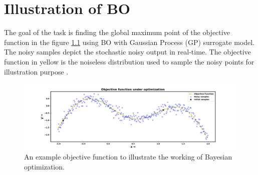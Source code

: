 \chapter{Illustration of BO}
\label{appendix:appendix_bo}
The goal of the task is finding the global maximum point of the objective function in the figure \ref{fig:BO_objective} using BO with Gaussian Process (GP) surrogate model. The noisy samples depict the stochastic noisy output in real-time. The objective function in yellow is the noiseless distribution used to sample the noisy points for illustration purpose \cite{martin_bo_tutorial}. 

\begin{figure}[!ht]
\centering
\includegraphics[width=0.8\linewidth,height=0.25\textheight]{images/BO_objective.png}
\captionsetup{justification=justified}
\caption[An example objective function under BO]{An example objective function to illustrate the working of Bayesian optimization.}
\label{fig:BO_objective}
\end{figure}

